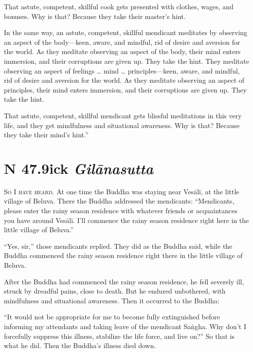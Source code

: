 \documentclass[12pt,openany]{book}%
\newcommand*{\suttatitleacronym}[1]{\smaller[2]{#1}\vspace*{.3em}}
\newcommand*{\suttatitletranslation}[1]{\linebreak{#1}}
\newcommand*{\suttatitleroot}[1]{\linebreak\smaller[2]\itshape{#1}}
\newcommand*{\tocacronym}[1]{\hspace*{-3.3em}{#1}\quad}
\newcommand*{\toctranslation}[1]{#1}
\newcommand*{\tocroot}[1]{(\textit{#1})}
\newcommand*{\scevam}[1]{\textsc{#1}}
\begin{document}
That astute, competent, skillful cook gets presented with clothes, wages, and bonuses. Why is that? Because they take their master’s hint. 

In the same way, an astute, competent, skillful mendicant meditates by observing an aspect of the body—keen, aware, and mindful, rid of desire and aversion for the world. As they meditate observing an aspect of the body, their mind enters immersion, and their corruptions are given up. They take the hint. They meditate observing an aspect of feelings … mind … principles—keen, aware, and mindful, rid of desire and aversion for the world. As they meditate observing an aspect of principles, their mind enters immersion, and their corruptions are given up. They take the hint. 

That astute, competent, skillful mendicant gets blissful meditations in this very life, and they get mindfulness and situational awareness. Why is that? Because they take their mind’s hint.” 

%
\section*{{\suttatitleacronym SN 47.9}{\suttatitletranslation Sick }{\suttatitleroot Gilānasutta}}
\addcontentsline{toc}{section}{\tocacronym{SN 47.9} \toctranslation{Sick } \tocroot{Gilānasutta}}

\scevam{So I have heard. }At one time the Buddha was staying near \textsanskrit{Vesālī}, at the little village of Beluva. There the Buddha addressed the mendicants: “Mendicants, please enter the rainy season residence with whatever friends or acquaintances you have around \textsanskrit{Vesālī}. I’ll commence the rainy season residence right here in the little village of Beluva.” 

“Yes, sir,” those mendicants replied. They did as the Buddha said, while the Buddha commenced the rainy season residence right there in the little village of Beluva. 

After the Buddha had commenced the rainy season residence, he fell severely ill, struck by dreadful pains, close to death. But he endured unbothered, with mindfulness and situational awareness. Then it occurred to the Buddha: 

“It would not be appropriate for me to become fully extinguished before informing my attendants and taking leave of the mendicant \textsanskrit{Saṅgha}. Why don’t I forcefully suppress this illness, stabilize the life force, and live on?” So that is what he did. Then the Buddha’s illness died down. 
\end{document}
